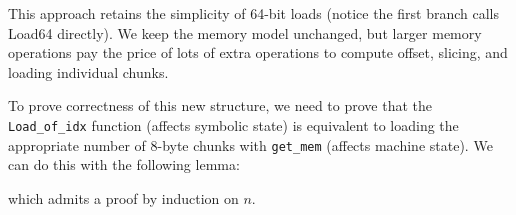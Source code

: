 This approach retains the simplicity of 64-bit loads (notice the first branch calls Load64 directly). We keep the memory model unchanged, but larger memory operations pay the price of lots of extra operations to compute offset, slicing, and loading individual chunks.

To prove correctness of this new structure, we need to prove that the \verb|Load_of_idx| function (affects symbolic state) is equivalent to loading the appropriate number of 8-byte chunks with \verb|get_mem| (affects machine state). We can do this with the following lemma:


which admits a proof by induction on $n$.


